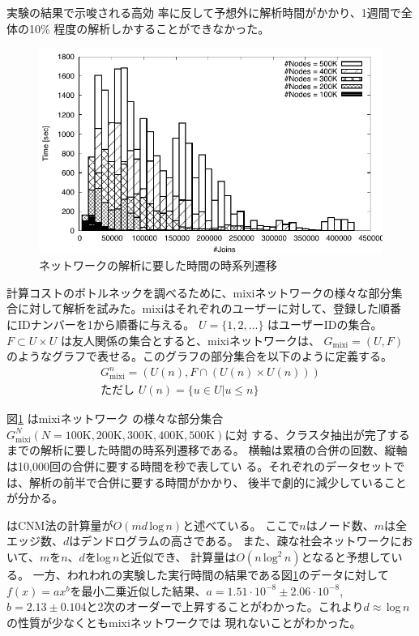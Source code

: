 \documentclass [a4j,11pt] {jsarticle}
\begin{document}
実験の結果\cite{clauset-2004-finding-community-structure-in-very-large}で示唆される高効
率に反して予想外に解析時間がかかり、1週間で全体の10\%
程度の解析しかすることができなかった。

\begin {figure}[htbp]
  \centerline {\includegraphics [width=0.80\linewidth]{fig2-cnm-joins-time-series.pdf}}
  \caption {ネットワークの解析に要した時間の時系列遷移}
  \label {fig: newman time diff}
\end{figure}

計算コストのボトルネックを調べるために、mixiネットワークの様々な部分集
合に対して解析を試みた。mixiはそれぞれのユーザーに対して、登録した順番
にIDナンバーを1から順番に与える。
$U= \{1,2,\ldots\}$
はユーザーIDの集合。
$F \subset U\times U$
は友人関係の集合とすると、mixiネットワークは、
$G_{\text {mixi}} = (U, F)$
のようなグラフで表せる。このグラフの部分集合を以下のように定義する。
%
\begin {align*}
  G_{\text {mixi}}^n = (U(n), F \cap (U(n) \times U(n))) \\
  \text {ただし } U(n) = \{ u \in U | u \le n \}
\end {align*}

図\ref {fig: newman time diff} はmixiネットワーク
の様々な部分集合$G_{\text {mixi}}^N (N = \text {100K}, \text {200K},
\text {300K}, \text {400K}, \text {500K})$に対
する、クラスタ抽出が完了するまでの解析に要した時間の時系列遷移である。
横軸は累積の合併の回数、縦軸は10,000回の合併に要する時間を秒で表してい
る。それぞれのデータセットでは、解析の前半で合併に要する時間がかかり、
後半で劇的に減少していることが分かる。

\cite{clauset-2004-finding-community-structure-in-very-large}
はCNM法の計算量が$O(md\,\text{log}\,n)$と述べている。
ここで$n$はノード数、$m$は全エッジ数、$d$はデンドログラムの高さである。
また、疎な社会ネットワークにおいて、$m$を$n$、$d$をlog\,$n$と近似でき、
計算量は$O(n\,\text{log}^2\,n)$となると予想している。
一方、われわれの実験した実行時間の結果である図\ref{fig: newman time diff}のデータに対して
$f(x) = ax^b$を最小二乗近似した結果、$a = 1.51\cdot10^{-8} \pm2.06\cdot10^{-8}$,
$b = 2.13\pm0.104$と2次のオーダーで上昇することがわかった。これより$d\approx$\,log\,$n$の性質が少なくともmixiネットワークでは
現れないことがわかった。
\end{document}
